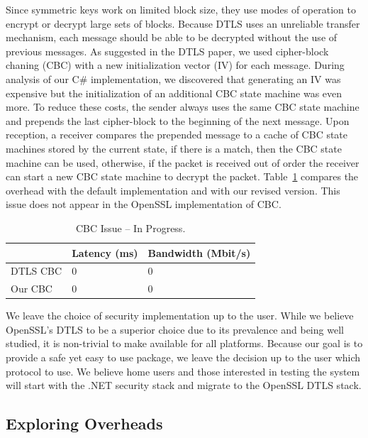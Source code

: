 \documentclass[conference]{IEEEtran}
\begin{document}
Since symmetric keys work on limited block size, they use modes of operation
to encrypt or decrypt large sets of blocks.  Because DTLS uses an unreliable
transfer mechanism, each message should be able to be decrypted without the use
of previous messages.  As suggested in the DTLS paper, we used cipher-block
chaning (CBC) with a new initialization vector (IV) for each message.  During
analysis of our C\# implementation, we discovered that generating an IV was
expensive but the initialization of an additional CBC state machine was even
more.  To reduce these costs, the sender always uses the same CBC state machine
and prepends the last cipher-block to the beginning of the next message.  Upon
reception, a receiver compares the prepended message to a cache of CBC state
machines stored by the current state, if there is a match, then the CBC state
machine can be used, otherwise, if the packet is received out of order the
receiver can start a new CBC state machine to decrypt the packet.
Table~\ref{tab:cbc_issue} compares the overhead with the default implementation
and with our revised version.  This issue does not appear in the OpenSSL
implementation of CBC.

\begin{table}[h]
\setlength{\itemsep}{0pt}
\setlength{\parskip}{0pt}
\centering
\begin{tabular}[c]{|m{1.5cm}||m{3cm}|m{3cm}|} \hline
& Latency (ms) & Bandwidth (Mbit/s) \\ \hline\hline
DTLS CBC & 0 & 0 \\ \hline
Our CBC & 0 & 0 \\ \hline
\end{tabular}
\caption{CBC Issue -- In Progress.}
\label{tab:cbc_issue}
\end{table}

We leave the choice of security implementation up to the user.  While we believe
OpenSSL's DTLS to be a superior choice due to its prevalence and being well
studied, it is non-trivial to make available for all platforms.  Because our
goal is to provide a safe yet easy to use package, we leave the decision up to
the user which protocol to use.  We believe home users and those interested in
testing the system will start with the .NET security stack and migrate to the
OpenSSL DTLS stack.

\subsection{Exploring Overheads}
\end{document}
